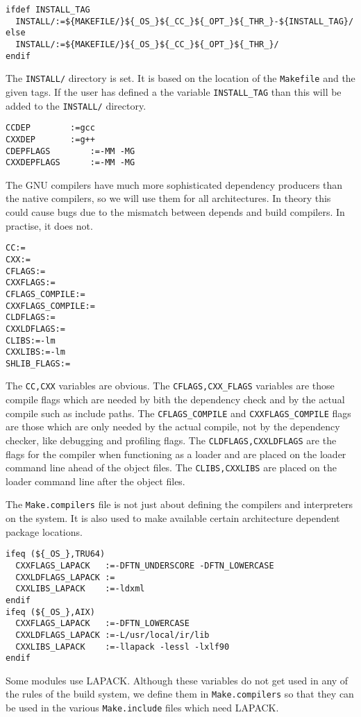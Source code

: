 \documentclass{article}
\begin{document}
\begin{verbatim}
ifdef INSTALL_TAG
  INSTALL/:=${MAKEFILE/}${_OS_}${_CC_}${_OPT_}${_THR_}-${INSTALL_TAG}/
else
  INSTALL/:=${MAKEFILE/}${_OS_}${_CC_}${_OPT_}${_THR_}/
endif
\end{verbatim}
The \verb+INSTALL/+ directory is set.  It is based on the location
of the \verb+Makefile+ and the given tags.
If the user has defined a the variable \verb+INSTALL_TAG+ than this
will be added to the \verb+INSTALL/+ directory.

\begin{verbatim}
CCDEP		 :=gcc
CXXDEP		 :=g++
CDEPFLAGS        :=-MM -MG
CXXDEPFLAGS      :=-MM -MG
\end{verbatim}
The GNU compilers have much more sophisticated dependency producers than
the native compilers, so we will use them for all architectures.  In
theory this could cause bugs due to the mismatch between depends and
build compilers.  In practise, it does not.

\begin{verbatim}
CC:=
CXX:=
CFLAGS:=
CXXFLAGS:=
CFLAGS_COMPILE:=
CXXFLAGS_COMPILE:=
CLDFLAGS:=
CXXLDFLAGS:=
CLIBS:=-lm
CXXLIBS:=-lm
SHLIB_FLAGS:=
\end{verbatim}
The \verb+CC,CXX+ variables are obvious.  The \verb+CFLAGS,CXX_FLAGS+
variables are those compile flags which are needed by bith the
dependency check and by the actual compile such as
include paths.  The \verb+CFLAGS_COMPILE+
and \verb+CXXFLAGS_COMPILE+ flags are those which are only needed by
the actual compile, not by the dependency checker, like debugging
and profiling flags.  The \verb+CLDFLAGS,CXXLDFLAGS+ are the flags
for the compiler when functioning as a loader and are placed on
the loader command line ahead of the object files.  The
\verb+CLIBS,CXXLIBS+ are placed on the loader command line after the
object files.

The \verb+Make.compilers+ file is not just about defining the compilers
and interpreters on the system.  It is also used to make available certain
architecture dependent package locations.
\begin{verbatim}
ifeq (${_OS_},TRU64)
  CXXFLAGS_LAPACK   :=-DFTN_UNDERSCORE -DFTN_LOWERCASE
  CXXLDFLAGS_LAPACK :=
  CXXLIBS_LAPACK    :=-ldxml
endif
ifeq (${_OS_},AIX)
  CXXFLAGS_LAPACK   :=-DFTN_LOWERCASE
  CXXLDFLAGS_LAPACK :=-L/usr/local/ir/lib
  CXXLIBS_LAPACK    :=-llapack -lessl -lxlf90
endif
\end{verbatim}
Some modules use LAPACK.  Although these variables do not get used
in any of the rules of the build system, we define them in 
\verb+Make.compilers+ so that they can be used in the various
\verb+Make.include+ files which need LAPACK.
\end{document}
